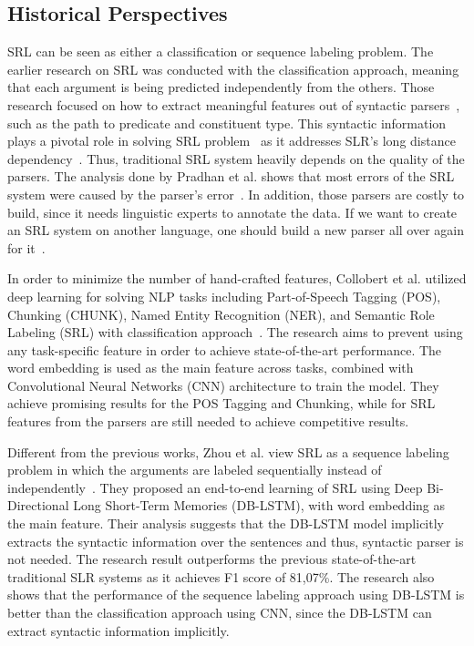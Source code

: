\subsection{Historical Perspectives}
SRL can be seen as either a classification or sequence labeling problem. The earlier research on SRL was conducted with the classification approach, meaning that each argument is being predicted independently from the others. Those research focused on how to extract meaningful features out of syntactic parsers~\citep{gildea2002automatic, gildea2002necessity, pradhan2005semantic}, such as the path to predicate and constituent type. This syntactic information plays a pivotal role in solving SRL problem~\citep{punyakanok2008importance} as it addresses SLR's long distance dependency~\citep{zhou2015end}. Thus, traditional SRL system heavily depends on the quality of the parsers. The analysis done by Pradhan et al. shows that most errors of the SRL system were caused by the parser's error~\citep{pradhan2005semantic}. In addition, those parsers are costly to build, since it needs linguistic experts to annotate the data. If we want to create an SRL system on another language, one should build a new parser all over again for it~\citep{zhou2015end}.

In order to minimize the number of hand-crafted features, Collobert et al. utilized deep learning for solving NLP tasks including Part-of-Speech Tagging (POS), Chunking (CHUNK), Named Entity Recognition (NER), and Semantic Role Labeling (SRL) with classification approach~\citep{collobert2011natural}. The research aims to prevent using any task-specific feature in order to achieve state-of-the-art performance. The word embedding is used as the main feature across tasks, combined with Convolutional Neural Networks (CNN) architecture to train the model. They achieve promising results for the POS Tagging and Chunking, while for SRL features from the parsers are still needed to achieve competitive results.

Different from the previous works, Zhou et al. view SRL as a sequence labeling problem in which the arguments are labeled sequentially instead of independently~\citep{zhou2015end}. They proposed an end-to-end learning of SRL using Deep Bi-Directional Long Short-Term Memories (DB-LSTM), with word embedding as the main feature. Their analysis suggests that the DB-LSTM model implicitly extracts the syntactic information over the sentences and thus, syntactic parser is not needed. The research result outperforms the previous state-of-the-art traditional SLR systems as it achieves F1 score of 81,07\%. The research also shows that the performance of the sequence labeling approach using DB-LSTM is better than the classification approach using CNN, since the DB-LSTM can extract syntactic information implicitly.

